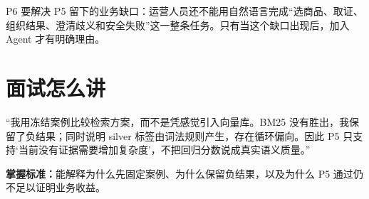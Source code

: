 P6 要解决 P5 留下的业务缺口：运营人员还不能用自然语言完成“选商品、取证、组织结果、澄清歧义和安全失败”这一整条任务。只有当这个缺口出现后，加入 Agent 才有明确理由。

\section{面试怎么讲}

\begin{interviewbox}
“我用冻结案例比较检索方案，而不是凭感觉引入向量库。BM25 没有胜出，我保留了负结果；同时说明 silver 标签由词法规则产生，存在循环偏向。因此 P5 只支持‘当前没有证据需要增加复杂度’，不把回归分数说成真实语义质量。”
\end{interviewbox}

\textbf{掌握标准：}能解释为什么先固定案例、为什么保留负结果，以及为什么 P5 通过仍不足以证明业务收益。
